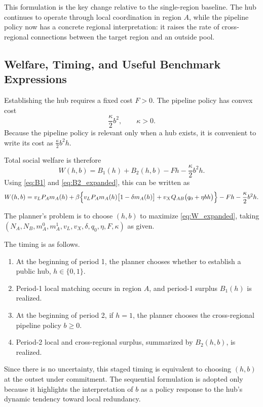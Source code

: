 This formulation is the key change relative to the single-region baseline. The hub continues to operate through local coordination in region $A$, while the pipeline policy now has a concrete regional interpretation: it raises the rate of cross-regional connections between the target region and an outside pool.

\subsection{Welfare, Timing, and Useful Benchmark Expressions}

Establishing the hub requires a fixed cost $F>0$. The pipeline policy has convex cost
\[
\frac{\kappa}{2}b^2,
\qquad
\kappa>0.
\]
Because the pipeline policy is relevant only when a hub exists, it is convenient to write its cost as $\frac{\kappa}{2}b^2 h$.

Total social welfare is therefore
\begin{equation}
W(h,b)
=
B_1(h)+B_2(h,b)-Fh-\frac{\kappa}{2}b^2 h.
\label{eq:W_general}
\end{equation}
Using \eqref{eq:B1} and \eqref{eq:B2_expanded}, this can be written as
\begin{equation}
W(h,b)
=
v_L P_A m_A(h)
+
\beta\Bigl\{v_L P_A m_A(h)\bigl[1-\delta m_A(h)\bigr] + v_X Q_{AB}\bigl(q_0+\eta b h\bigr)\Bigr\}
-Fh-\frac{\kappa}{2}b^2 h.
\label{eq:W_expanded}
\end{equation}

The planner's problem is to choose $(h,b)$ to maximize \eqref{eq:W_expanded}, taking $(N_A,N_B,m_A^0,m_A^1,v_L,v_X,\delta,q_0,\eta,F,\kappa)$ as given.

The timing is as follows.

\begin{enumerate}[leftmargin=2em]
    \item At the beginning of period 1, the planner chooses whether to establish a public hub, $h\in\{0,1\}$.
    \item Period-1 local matching occurs in region $A$, and period-1 surplus $B_1(h)$ is realized.
    \item At the beginning of period 2, if $h=1$, the planner chooses the cross-regional pipeline policy $b\ge 0$.
    \item Period-2 local and cross-regional surplus, summarized by $B_2(h,b)$, is realized.
\end{enumerate}

Since there is no uncertainty, this staged timing is equivalent to choosing $(h,b)$ at the outset under commitment. The sequential formulation is adopted only because it highlights the interpretation of $b$ as a policy response to the hub's dynamic tendency toward local redundancy.


